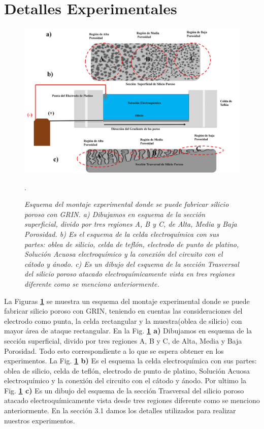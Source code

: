 \documentclass[a4paper,11pt,]{book}
\begin{document}
\section{Detalles Experimentales}
\begin{figure}[H]
	\centering
	\includegraphics[scale=0.35]{../Images/DE1}
	\caption{\emph{Esquema del montaje experimental donde se puede fabricar silicio poroso con GRIN. a) Dibujamos en esquema de la sección superficial, divido por tres regiones A, B y C, de Alta, Media y Baja Porosidad. b) Es el esquema de la celda electroquímica con sus partes: oblea de silicio,  celda de teflón, electrodo de punto de platino, Solución Acuosa electroquímico y la conexión del circuito con el cátodo y ánodo. c) Es un dibujo del esquema de la sección Trasversal del silicio poroso atacado electroquímicamente vista en tres regiones diferente como se  menciono anteriormente. }}.
	\label{fig:DE1}
\end{figure}
La Figuras \textbf{\ref{fig:DE1}} se muestra un esquema del montaje experimental donde se puede fabricar silicio poroso con GRIN, teniendo en cuentas las consideraciones del electrodo como punta, la celda rectangular y la muestra(oblea de silicio) con mayor área de ataque rectangular.
En la Fig. \textbf{\ref{fig:DE1} a)} Dibujamos en esquema de  la sección superficial, divido por tres regiones A, B y C, de Alta, Media y Baja Porosidad. Todo esto correspondiente a lo que se espera obtener en los experimentos. La Fig. \textbf{\ref{fig:DE1} b)} Es el esquema  la celda electroquímica con sus partes: oblea de silicio,  celda de teflón, electrodo de punto de platino, Solución Acuosa electroquímico y la conexión del circuito con el cátodo y ánodo. Por ultimo la  Fig. \textbf{\ref{fig:DE1} c)} Es un dibujo del esquema de la sección Trasversal del silicio poroso atacado electroquímicamente vista desde  tres regiones diferente como se  menciono anteriormente. En la sección 3.1 damos los detalles utilizados para realizar nuestros experimentos.
\end{document}
